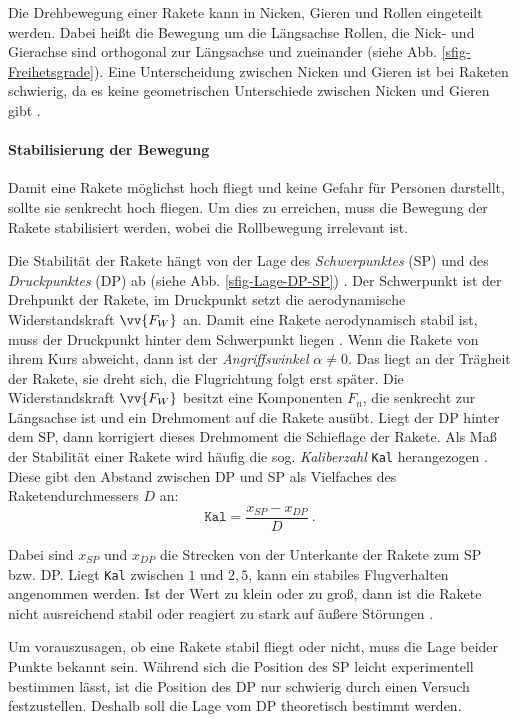 \documentclass[10pt,a4paper]{article}
\begin{document}
Die Drehbewegung einer Rakete kann in Nicken, Gieren und Rollen eingeteilt werden. Dabei heißt die Bewegung um die Längsachse Rollen, die Nick- und Gierachse sind orthogonal zur Längsachse und zueinander (siehe Abb. \ref{sfig-Freihetsgrade}). Eine Unterscheidung zwischen Nicken und Gieren ist bei Raketen schwierig, da es keine geometrischen Unterschiede zwischen Nicken und Gieren gibt \cite{AbR}.

\paragraph{Stabilisierung der Bewegung}
Damit eine Rakete möglichst hoch fliegt und keine Gefahr für Personen darstellt, sollte sie senkrecht hoch fliegen. Um dies zu erreichen, muss die Bewegung der Rakete stabilisiert werden, wobei die Rollbewegung irrelevant ist.

Die Stabilität der Rakete hängt von der Lage des \textit{Schwerpunktes} (SP) und des \textit{Druckpunktes} (DP) ab (siehe Abb. \ref{sfig-Lage-DP-SP}) \cite{AbR}. Der Schwerpunkt ist der  Drehpunkt der Rakete, im Druckpunkt setzt die aerodynamische Widerstandskraft $ \vv{F_{W}} $ \cite{AbR} an.
Damit eine Rakete aerodynamisch stabil ist, muss der Druckpunkt hinter dem Schwerpunkt liegen \cite{AbR,om}. Wenn die Rakete von ihrem Kurs abweicht, dann ist der \textit{Angriffswinkel} $\alpha \neq 0$. Das liegt an der Trägheit der Rakete, sie dreht sich, die Flugrichtung folgt erst später. Die Widerstandskraft $\vv{F_{W}}$ besitzt eine Komponenten $F_{n}$, die senkrecht zur Längsachse ist und ein Drehmoment auf die Rakete ausübt. Liegt der DP hinter dem SP, dann korrigiert dieses Drehmoment die Schieflage der Rakete.
Als Maß der Stabilität einer Rakete wird häufig die sog. \textit{Kaliberzahl} \texttt{Kal} herangezogen \cite{AbR,dl,om,sn}. Diese gibt den Abstand zwischen DP und SP als Vielfaches des Raketendurchmessers $D$ an:
\begin{equation}
\mathtt{Kal} = \frac{x_{SP}-x_{DP}}{D} \ .
\end{equation}

\noindent
Dabei sind $x_{SP}$ und $x_{DP}$ die Strecken von der Unterkante der Rakete zum SP bzw. DP. Liegt \texttt{Kal} zwischen $1$ und $2,5$, kann ein stabiles Flugverhalten angenommen werden. Ist der Wert zu klein oder zu groß, dann ist die Rakete nicht ausreichend stabil oder reagiert zu stark auf äußere Störungen \cite{om}.

Um vorauszusagen, ob eine Rakete stabil fliegt oder nicht, muss die Lage beider Punkte bekannt sein. Während sich die Position des SP leicht experimentell bestimmen lässt, ist die Position des DP nur schwierig durch einen Versuch festzustellen. Deshalb soll die Lage vom DP theoretisch bestimmt werden.
\end{document}
